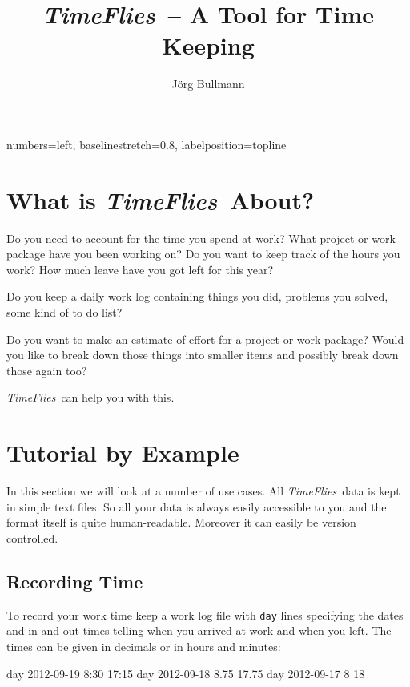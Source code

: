 \documentclass[11pt]{article}
\newcommand{\timeflies}{\emph{TimeFlies}}
\begin{document}
   {%
    numbers=left,
    baselinestretch=0.8,
    labelposition=topline}


\title{\timeflies\ -- A Tool for Time Keeping}
\author{J\"org Bullmann}
\maketitle
\tableofcontents
\newpage

\section{What is \timeflies\ About?}

Do you need to account for the time you spend at work? What project or work package have you been working on? Do you want to keep track of the hours you work? How much leave have you got left for this year?

Do you keep a daily work log containing things you did, problems you solved, some kind of to do list?

Do you want to make an estimate of effort for a project or work package? Would you like to break down those things into smaller items and possibly break down those again too?

\timeflies\ can help you with this.

\section{Tutorial by Example}

In this section we will look at a number of use cases. All \timeflies\ data is kept in simple text files. So all your data is always easily accessible to you and the format itself is quite human-readable. Moreover it can easily be version controlled.

\subsection{Recording Time}

To record your work time keep a work log file with \verb-day- lines specifying the dates and in and out times telling when you arrived at work and when you left. The times can be given in decimals or in hours and minutes:

\begin{inputfile}
day 2012-09-19 8:30 17:15
day 2012-09-18 8.75 17.75
day 2012-09-17 8 18
\end{inputfile}
\end{document}
